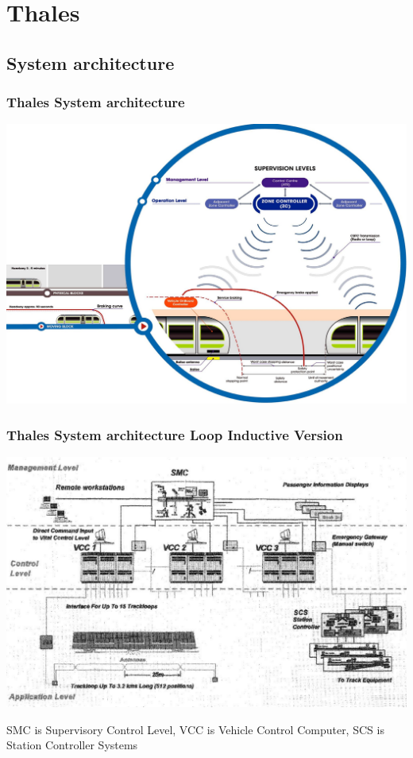 

\section{Thales}
\subsection{System architecture}
\frame
{
  \frametitle{Thales System architecture}
 \begin{center}
	\includegraphics[scale=0.2]{./fig/SeltracArchitetture2}
      \end{center}
   
}

\frame
{
  \frametitle{Thales System architecture Loop Inductive Version}
 \begin{center}
	\includegraphics[scale=0.25]{./fig/SeltracTBTCArchitetture}
      \end{center}
      {\tiny  SMC is Supervisory Control Level, VCC is Vehicle Control Computer, SCS is Station Controller Systems}
   
}

